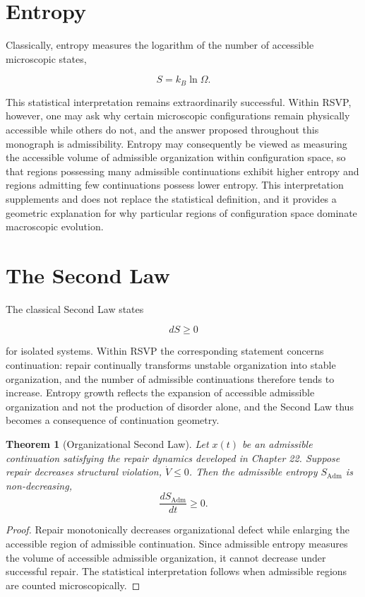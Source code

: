 \documentclass[11pt,oneside]{book}
\numberwithin{equation}{chapter}
\theoremstyle{definition}
\theoremstyle{plain}
\newtheorem{theorem}[definition]{Theorem}
\begin{document}
\section{Entropy}

Classically, entropy measures the logarithm of the number of accessible
microscopic states,

\[
S
=
k_B
\ln\Omega.
\]

This statistical interpretation remains extraordinarily successful. Within RSVP, however, one may ask why certain microscopic configurations remain physically accessible while others do not, and the answer proposed throughout this monograph is admissibility. Entropy may consequently be viewed as measuring the accessible volume of admissible organization within configuration space, so that regions possessing many admissible continuations exhibit higher entropy and regions admitting few continuations possess lower entropy. This interpretation supplements and does not replace the statistical definition, and it provides a geometric explanation for why particular regions of configuration space dominate macroscopic evolution.

\section{The Second Law}

The classical Second Law states

\[
dS
\ge
0
\]

for isolated systems. Within RSVP the corresponding statement concerns continuation: repair continually transforms unstable organization into stable organization, and the number of admissible continuations therefore tends to increase. Entropy growth reflects the expansion of accessible admissible organization and not the production of disorder alone, and the Second Law thus becomes a consequence of continuation geometry.

\begin{theorem}[Organizational Second Law]
Let \(x(t)\) be an admissible continuation satisfying the repair dynamics
developed in Chapter 22. Suppose repair decreases structural violation,
\(\dot V\le 0\). Then the admissible entropy \(S_{\mathrm{Adm}}\) is
non-decreasing,
\[
\boxed{
\frac{dS_{\mathrm{Adm}}}{dt}
\ge
0.
}
\]
\end{theorem}

\begin{proof}
Repair monotonically decreases organizational defect while enlarging the
accessible region of admissible continuation. Since admissible entropy
measures the volume of accessible admissible organization, it cannot
decrease under successful repair. The statistical interpretation follows
when admissible regions are counted microscopically.
\end{proof}
\end{document}
